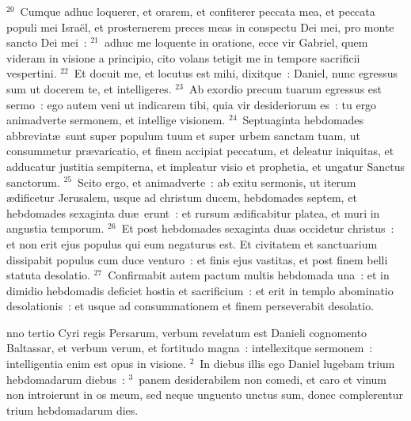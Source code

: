 ${}^{20}$~Cumque adhuc loquerer, et orarem, et confiterer peccata mea, et peccata populi mei Isra\"el, et prosternerem preces meas in conspectu Dei mei, pro monte sancto Dei mei~:
${}^{21}$~adhuc me loquente in oratione, ecce vir Gabriel, quem videram in visione a principio, cito volans tetigit me in tempore sacrificii vespertini.
${}^{22}$~Et docuit me, et locutus est mihi, dixitque~: Daniel, nunc egressus sum ut docerem te, et intelligeres.
${}^{23}$~Ab exordio precum tuarum egressus est sermo~: ego autem veni ut indicarem tibi, quia vir desideriorum es~: tu ergo animadverte sermonem, et intellige visionem.
${}^{24}$~Septuaginta hebdomades abbreviat\ae\ sunt super populum tuum et super urbem sanctam tuam, ut consummetur pr\ae varicatio, et finem accipiat peccatum, et deleatur iniquitas, et adducatur justitia sempiterna, et impleatur visio et prophetia, et ungatur Sanctus sanctorum.
${}^{25}$~Scito ergo, et animadverte~: ab exitu sermonis, ut iterum \ae dificetur Jerusalem, usque ad christum ducem, hebdomades septem, et hebdomades sexaginta du\ae\ erunt~: et rursum \ae dificabitur platea, et muri in angustia temporum.
${}^{26}$~Et post hebdomades sexaginta duas occidetur christus~: et non erit ejus populus qui eum negaturus est. Et civitatem et sanctuarium dissipabit populus cum duce venturo~: et finis ejus vastitas, et post finem belli statuta desolatio.
${}^{27}$~Confirmabit autem pactum multis hebdomada una~: et in dimidio hebdomadis deficiet hostia et sacrificium~: et erit in templo abominatio desolationis~: et usque ad consummationem et finem perseverabit desolatio.

\bchapter
{}nno tertio Cyri regis Persarum, verbum revelatum est Danieli cognomento Baltassar, et verbum verum, et fortitudo magna~: intellexitque sermonem~: intelligentia enim est opus in visione.
${}^{2}$~In diebus illis ego Daniel lugebam trium hebdomadarum diebus~:
${}^{3}$~panem desiderabilem non comedi, et caro et vinum non introierunt in os meum, sed neque unguento unctus sum, donec complerentur trium hebdomadarum dies.


